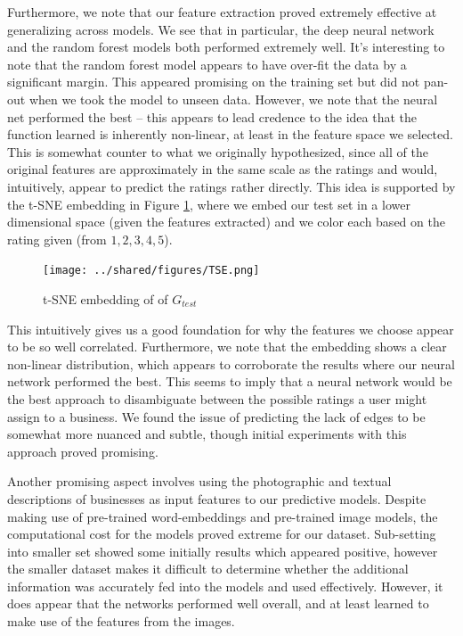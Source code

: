 \documentclass[letterpaper, 10 pt, conference]{ieeeconf}  %
\begin{document}
Furthermore, we note that our feature extraction proved extremely effective at generalizing across models. We see that in particular, the deep neural network and the random forest models both performed extremely well. It's interesting to note that the random forest model appears to have over-fit the data by a significant margin. This appeared promising on the training set but did not pan-out when we took the model to unseen data. However, we note that the neural net performed the best -- this appears to lead credence to the idea that the function learned is inherently non-linear, at least in the feature space we selected. This is somewhat counter to what we originally hypothesized, since all of the original features are approximately in the same scale as the ratings and would, intuitively, appear to predict the ratings rather directly. This idea is supported by the t-SNE embedding in Figure \ref{fig:tsne_embedding}, where we embed our test set in a lower dimensional space (given the features extracted) and we color each based on the rating given (from $1,2,3,4,5$). 

\begin{figure}[h!]
\centering
\texttt{[image: ../shared/figures/TSE.png]}
\caption{t-SNE embedding of of $G_{test}$}
\label{fig:tsne_embedding}
\end{figure}


This intuitively gives us a good foundation for why the features we choose appear to be so well correlated. Furthermore, we note that the embedding shows a clear non-linear distribution, which appears to corroborate the results where our neural network performed the best. This seems to imply that a neural network would be the best approach to disambiguate between the possible ratings a user might assign to a business. We found the issue of predicting the lack of edges to be somewhat more nuanced and subtle, though initial experiments with this approach proved promising.

Another promising aspect involves using the photographic and textual descriptions of businesses as input features to our predictive models. Despite making use of pre-trained word-embeddings and pre-trained image models, the computational cost for the models proved extreme for our dataset. Sub-setting into smaller set showed some initially results which appeared positive, however the smaller dataset makes it difficult to determine whether the additional information was accurately fed into the models and used effectively. However, it does appear that the networks performed well overall, and at least learned to make use of the features from the images.
\end{document}
